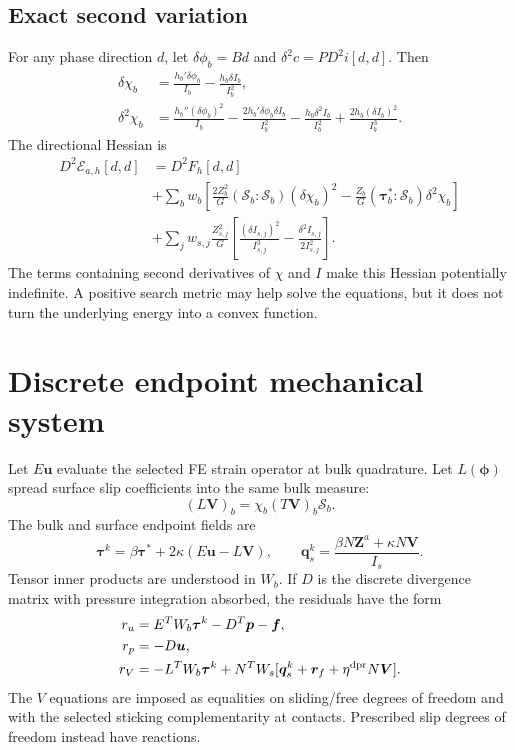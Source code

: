 \documentclass[11pt,a4paper]{article}
\newcommand{\Smat}{\bm{\mathcal S}}
\newcommand{\tauv}{\bm\tau}
\newcommand{\Ecal}{\mathscr E}
\newcommand{\vect}[1]{\boldsymbol{#1}}
\begin{document}
\subsection{Exact second variation}

For any phase direction $d$, let $\delta\phi_b=Bd$ and
$\delta^2 c=P D^2i[d,d]$. Then
\begin{align}
 \delta\chi_b&=\frac{h_b'\delta\phi_b}{I_b}
                    -\frac{h_b\delta I_b}{I_b^2},\\
 \delta^2\chi_b&=\frac{h_b''(\delta\phi_b)^2}{I_b}
 -\frac{2h_b'\delta\phi_b\delta I_b}{I_b^2}
 -\frac{h_b\delta^2I_b}{I_b^2}
 +\frac{2h_b(\delta I_b)^2}{I_b^3}.
\end{align}
The directional Hessian is
\begin{align}
 D^2\Ecal_{a,h}[d,d]
 &=D^2F_h[d,d]\nonumber\\
 &+\sum_b w_b\left[
 \frac{2Z_b^2}{G}(\Smat_b:\Smat_b)(\delta\chi_b)^2
 -\frac{Z_b}G(\tauv_b^*:\Smat_b)\delta^2\chi_b\right]\nonumber\\
 &+\sum_j w_{s,j}\frac{Z_{s,j}^2}{G}
 \left[\frac{(\delta I_{s,j})^2}{I_{s,j}^3}
             -\frac{\delta^2I_{s,j}}{2I_{s,j}^2}\right].
 \label{eq:discrete-hessian}
\end{align}
The terms containing second derivatives of $\chi$ and $I$ make this Hessian
potentially indefinite. A positive search metric may help solve the equations,
but it does not turn the underlying energy into a convex function.

\section{Discrete endpoint mechanical system}
\label{sec:discrete-mechanics}

Let $E\vect u$ evaluate the selected FE strain operator at bulk quadrature.
Let $L(\vect\phi)$ spread surface slip coefficients into the same bulk measure:
\begin{equation}
 (L\vect V)_b=\chi_b(T\vect V)_b\Smat_b.
 \label{eq:spread-map}
\end{equation}
The bulk and surface endpoint fields are
\begin{equation}
 \vect\tau^k=\beta\vect\tau^*+2\kappa(E\vect u-L\vect V),
 \qquad \vect q_s^k=\frac{\beta N\vect Z^a+\kappa N\vect V}{I_s}.
\end{equation}
Tensor inner products are understood in $W_b$. If $D$ is the discrete divergence
matrix with pressure integration absorbed, the residuals have the form
\begin{align}
 r_u&=E^TW_b\vect\tau^k-D^T\vect p-\vect f,\\
 r_p&=-D\vect u,\\
 r_V&=-L^TW_b\vect\tau^k
       +N^TW_s[\vect q_s^k+\vect r_f+\eta^{\rm dpr}N\vect V].
 \label{eq:mechanical-residuals}
\end{align}
The $V$ equations are imposed as equalities on sliding/free degrees of freedom
and with the selected sticking complementarity at contacts. Prescribed slip
degrees of freedom instead have reactions.
\end{document}
